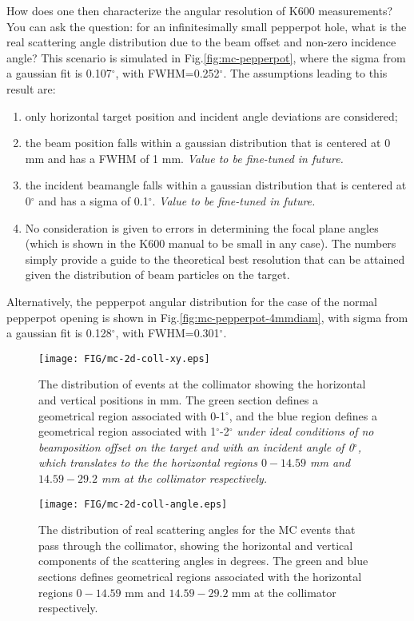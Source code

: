 \documentclass[11pt]{report}
\begin{document}
How does one then characterize the angular resolution of K600 measurements?
You can ask the question: for an infinitesimally small pepperpot hole, what is the 
real scattering angle distribution due to the beam offset and non-zero incidence angle?
This scenario is simulated in Fig.\ref{fig:mc-pepperpot},
where the sigma from a gaussian fit is 0.107$^{\circ}$, with FWHM=0.252$^{\circ}$.
The assumptions leading to this result are:
\begin{enumerate}
    \item only horizontal target position and incident angle deviations are considered;
    \item the beam position falls within a gaussian distribution that is centered at 0 mm and has a FWHM  of 1 mm. {\it Value to be fine-tuned in future.}
    \item the incident beamangle falls within a gaussian distribution that is centered at 0$^{\circ}$ and has a sigma of 0.1$^{\circ}$. {\it Value to be fine-tuned in future.}
    \item No consideration is given to errors in determining the focal plane angles (which is shown in the K600 manual to be small in any case). The numbers simply provide a guide to the theoretical best resolution that can be attained given the distribution of beam particles on the target.
\end{enumerate}
\noindent Alternatively, the pepperpot angular distribution for the case of the normal pepperpot opening is shown in Fig.\ref{fig:mc-pepperpot-4mmdiam}, with sigma from a gaussian fit is 0.128$^{\circ}$, with FWHM=0.301$^{\circ}$.



\begin{figure}
\centering
\texttt{[image: FIG/mc-2d-coll-xy.eps]}
\caption{The distribution of events at the collimator showing the horizontal and vertical positions in mm. 
The green section defines a geometrical region associated with  0-1$^{\circ}$, and the blue region defines a geometrical region associated with 1$^{\circ}$-2$^{\circ}$ {\it under ideal conditions of no beamposition offset on the target and with an incident angle of 0$^{\circ}$, which translates to the 
the horizontal regions $0 - 14.59$ mm and $14.59 - 29.2$ mm at the collimator respectively.}}
\label{fig:mc-2d-coll-xy}
\end{figure} 
\begin{figure}
\centering
\texttt{[image: FIG/mc-2d-coll-angle.eps]}
\caption{The distribution of real scattering angles for the MC events that pass through the collimator,  showing the horizontal and vertical components of the scattering angles in degrees. The green and blue sections defines geometrical regions associated with the horizontal regions $0 - 14.59$ mm and $14.59 - 29.2$ mm at the collimator respectively.}
\label{fig:mc-2d-coll-angle}
\end{figure} 
\end{document}
